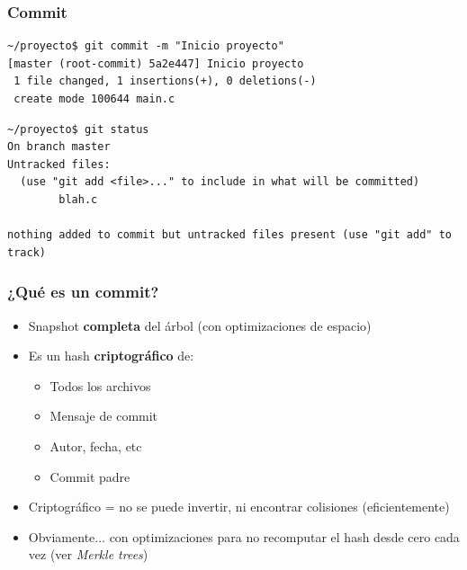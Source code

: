 \documentclass[a4paper, 12pt, aspectratio=169,
\ifhandout handout \else \fi
]{beamer}
\begin{document}

\begin{frame}[fragile]
    \frametitle{Commit}
\begin{lstlisting}
~/proyecto$ git commit -m "Inicio proyecto"
[master (root-commit) 5a2e447] Inicio proyecto
 1 file changed, 1 insertions(+), 0 deletions(-)
 create mode 100644 main.c
\end{lstlisting}\pause
\begin{lstlisting}
~/proyecto$ git status
On branch master
Untracked files:
  (use "git add <file>..." to include in what will be committed)
        blah.c

nothing added to commit but untracked files present (use "git add" to track)
\end{lstlisting}
\end{frame}

\begin{frame}[fragile]
    \frametitle{¿Qué es un commit?}
    \begin{itemize}
        \item Snapshot \textbf{completa} del árbol (con optimizaciones de espacio)
        \item Es un hash \textbf{criptográfico} de:
        \begin{itemize}
            \item Todos los archivos
            \item Mensaje de commit
            \item Autor, fecha, etc
            \item Commit padre
        \end{itemize}
        \pause
    \item Criptográfico = no se puede invertir, ni encontrar colisiones (eficientemente)
        \pause
    \item Obviamente... con optimizaciones para no recomputar el hash desde cero
        cada vez (ver \emph{Merkle trees})
    \end{itemize}
\end{frame}
\end{document}
